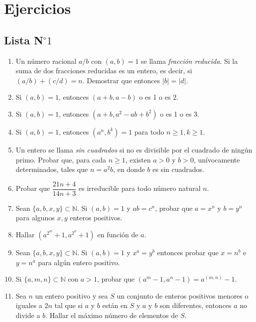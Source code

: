 \chapter{Ejercicios}
\section{Lista N$^{\circ}1$}
\begin{enumerate}[font={\bfseries},label={\arabic*.}]
\item Un número racional $a/b$ con $(a,b)=1$ se llama \emph{fracción reducida}. Si la suma de dos fracciones reducidas es un entero, es decir, si $(a/b)+(c/d)=n$. Demostrar que entonces $|b|=|d|$.

\item Si $(a,b)=1$, entonces $(a+b,a-b)$ o es 1 o es 2.

\item Si $(a,b)=1$, entonces $(a+b,a^{2}-ab+b^{2})$ o es 1 o es 3.

\item Si $(a,b)=1$, entonces $(a^{n},b^{k})=1$ para todo $n\geq1, k\geq1$.

\item Un entero se llama \emph{sin cuadrados} si no es divisible por el cuadrado de ningún primo. Probar que, para cada $n\geq1$, existen $a>0$ y $b>0$, unívocamente determinados, tales que $n=a^{2}b$, en donde $b$ es sin cuadrados.

\item Probar que $\dfrac{21n+4}{14n+3}$ es irreducible para todo número natural $n$.

\item Sean $\{a,b,x,y\}\subset\mathbb{N}$. Si $(a,b)=1$ y $ab=c^{n}$, probar que $a=x^{n}$ y $b=y^{n}$ para algunos $x,y$ enteros positivos.

\item Hallar $\left(a^{2^{m}}+1,a^{2^{n}}+1\right)$ en función de $a$.

\item Sean $\{a,b,x,y\}\subset\mathbb{N}$. Si $(a,b)=1$ y $x^{a}=y^{b}$ entonces probar que $x=n^{b}$ e $y=n^{a}$ para algún entero positivo.

\item Si $\{a,m,n\}\subset\mathbb{N}$ con $a>1$, probar que $\left(a^{m}-1,a^{n}-1\right)=a^{(m,n)}-1$.

\item Sea $n$ un entero positivo y sea $S$ un conjunto de enteros positivos menores o iguales a $2n$ tal que si $a$ y $b$ están en $S$ y $a$ y $b$ son diferentes, entonces $a$ no divide a $b$. Hallar el máximo número de elementos de $S$.


\end{enumerate}
